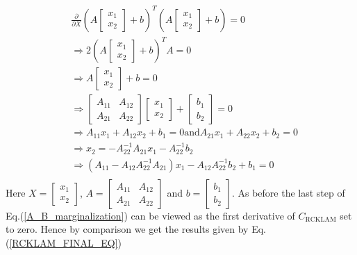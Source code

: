 \begin{equation}
\begin{split}
  &\frac{\partial}{\partial X} \left(A\begin{bmatrix}x_1 \\ x_2\end{bmatrix} + b\right)^T\left(A\begin{bmatrix}x_1 \\ x_2\end{bmatrix} + b\right) = 0 \\
  &\Rightarrow 2\left(A\begin{bmatrix}x_1 \\ x_2\end{bmatrix} + b\right)^TA = 0 \\
  &\Rightarrow A\begin{bmatrix}x_1 \\ x_2\end{bmatrix} + b = 0 \\
  &\Rightarrow \begin{bmatrix}A_{11} & A_{12}\\ A_{21} & A_{22}\end{bmatrix} \begin{bmatrix}x_1 \\ x_2\end{bmatrix} + \begin{bmatrix}b_1 \\ b_2\end{bmatrix} = 0 \\
  &\Rightarrow A_{11}x_1 + A_{12}x_2 + b_1 = 0 \text{and} A_{21}x_1 + A_{22}x_2 + b_2 = 0 \\ 
  &\Rightarrow x_2 = -A_{22}^{-1}A_{21}x_1 - A_{22}^{-1}b_2 \\
  &\Rightarrow \left(A_{11} - A_{12}A_{22}^{-1}A_{21}\right)x_1-A_{12}A_{22}^{-1}b_2 + b_1 = 0 \\
\end{split}
\label{A_B_marginalization}
\end{equation}
Here $X = \begin{bmatrix}x_1 \\ x_2\end{bmatrix}$, $A = \begin{bmatrix}A_{11} & A_{12}\\ A_{21} & A_{22}\end{bmatrix}$ and $b = \begin{bmatrix}b_1 \\ b_2\end{bmatrix}$. As before the last step of Eq.(\ref{A_B_marginalization}) can be viewed as the first derivative of $C_\mathrm{RCKLAM}$ set to zero. Hence by comparison we get the results given by Eq.(\ref{RCKLAM_FINAL_EQ})

